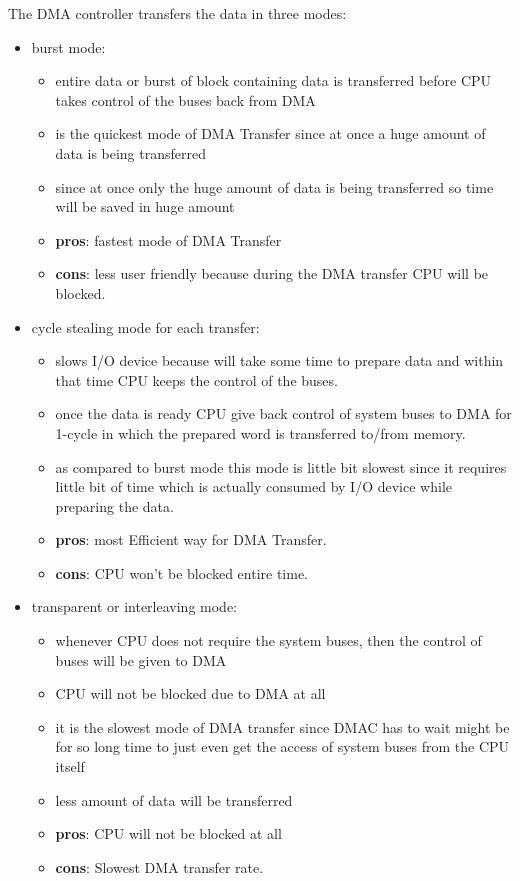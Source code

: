 The DMA controller transfers the data in three modes:
\begin{itemize}
    \item burst mode:
    \begin{itemize}
        \item entire data or burst of block containing data is transferred before CPU takes control of the buses back from DMA
        \item is the quickest mode of DMA Transfer since at once a huge amount of data is being transferred
        \item since at once only the huge amount of data is being transferred so time will be saved in huge amount
        \item {\bf pros}: fastest mode of DMA Transfer
        \item {\bf cons}: less user friendly because during the DMA transfer CPU will be blocked.
    \end{itemize}
    \item cycle stealing mode for each transfer:
    \begin{itemize}
        \item slows I/O device because will take some time to prepare data  and within that time CPU keeps the control of the buses.
        \item once the data is ready CPU give back control of system buses to DMA for 1-cycle in which the prepared word is transferred to/from memory.
        \item as compared to burst mode this mode is little bit slowest since it requires little bit of time which is actually consumed by I/O device while preparing the data.
        \item {\bf pros}: most Efficient way for DMA Transfer.
        \item {\bf cons}: CPU won’t be blocked entire time.
    \end{itemize}
    \item transparent or interleaving mode:
    \begin{itemize}
        \item whenever CPU does not require the system buses, then the control of buses will be given to DMA
        \item CPU will not be blocked due to DMA at all
        \item it is the slowest mode of DMA transfer since DMAC has to wait might be for so long time to just even get the access of system buses from the CPU itself
        \item less amount of data will be transferred
        \item {\bf pros}: CPU will not be blocked at all
        \item {\bf cons}: Slowest DMA transfer rate.
    \end{itemize}
\end{itemize}

